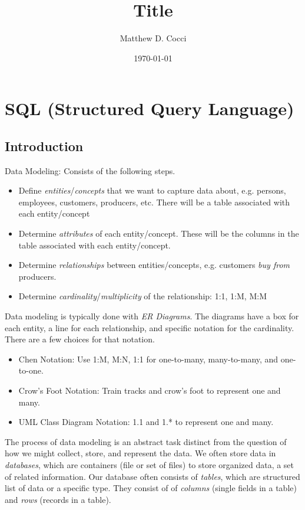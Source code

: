 \documentclass[12pt]{article}
\author{Matthew D. Cocci}
\title{Title}
\date{\today}
\theoremstyle{plain}
\theoremstyle{definition}
\theoremstyle{remark}
\begin{document}
\lstset{style=log}

\section{SQL (Structured Query Language)}

\subsection{Introduction}



Data Modeling:
Consists of the following steps.
\begin{itemize}
  \item Define \emph{entities}/\emph{concepts} that we want to capture
    data about, e.g.  persons, employees, customers, producers, etc.
    There will be a table associated with each entity/concept
  \item Determine \emph{attributes} of each entity/concept.
    These will be the columns in the table associated with each
    entity/concept.
  \item Determine \emph{relationships} between entities/concepts, e.g.
    customers \emph{buy from} producers.
  \item Determine \emph{cardinality}/\emph{multiplicity} of the
    relationship: 1:1, 1:M, M:M
\end{itemize}
Data modeling is typically done with \emph{ER Diagrams}.
The diagrams have a box for each entity, a line for each relationship,
and specific notation for the cardinality.
There are a few choices for that notation.
\begin{itemize}
  \item Chen Notation:
    Use 1:M, M:N, 1:1 for one-to-many, many-to-many, and
    one-to-one.
  \item Crow's Foot Notation:
    Train tracks and crow's foot to represent one and many.
  \item UML Class Diagram Notation:
    1.1 and 1.* to represent one and many.
\end{itemize}
The process of data modeling is an abstract task distinct from the
question of how we might collect, store, and represent the data.
We often store data in \emph{databases}, which are containers (file or
set of files) to store organized data, a set of related information.
Our database often consists of \emph{tables}, which are structured list
of data or a specific type.
They consist of of \emph{columns} (single fields in a table) and
\emph{rows} (records in a table).
\end{document}
